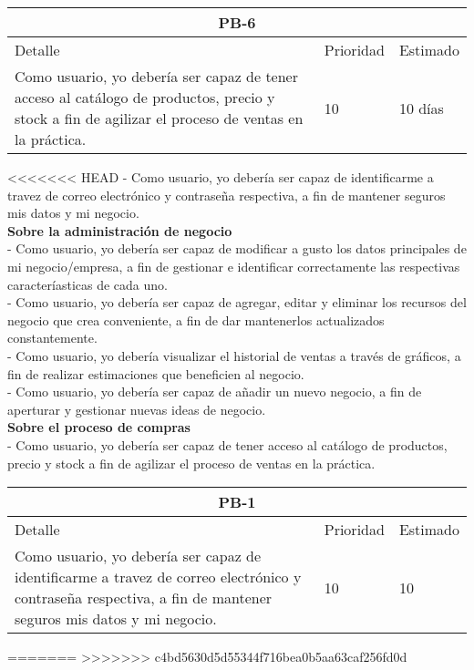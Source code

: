 \begin{table}[htbp]
	\begin{center}
		\begin{tabular}{|p{10cm} | p{2cm} | p{2cm}|}
			\hline
			\multicolumn{3}{|c|}{PB-6}\\
			\hline
			Detalle & Prioridad & Estimado \\
			\hline
			Como usuario, yo debería ser capaz de tener acceso al catálogo de productos, precio y stock a fin de agilizar el proceso de ventas en la práctica. & 10 & 10 días \\
			\hline	
		\end{tabular}
	\end{center}
\end{table}
<<<<<<< HEAD
- Como usuario, yo debería ser capaz de identificarme a travez de correo electrónico y contraseña respectiva, a fin de mantener seguros mis datos y mi negocio.\\
\textbf{Sobre la administración de negocio}\\
- Como usuario, yo debería ser capaz de modificar a gusto los datos principales de mi negocio/empresa, a fin de gestionar e identificar correctamente las respectivas caracteríasticas de cada uno.\\
- Como usuario, yo debería ser capaz de agregar, editar y eliminar los recursos del negocio que crea conveniente, a fin de dar mantenerlos actualizados constantemente.\\
- Como usuario, yo debería visualizar el historial de ventas a través de gráficos, a fin de realizar estimaciones que beneficien al negocio.\\
- Como usuario, yo debería ser capaz de añadir un nuevo negocio, a fin de aperturar y gestionar nuevas ideas de negocio.\\
\textbf{Sobre el proceso de compras}\\
- Como usuario, yo debería ser capaz de tener acceso al catálogo de productos, precio y stock a fin de agilizar el proceso de ventas en la práctica. 

\begin{table}
	\begin{center}
		\begin{tabular}{|p{10cm} | p{2cm} | p{2cm}|}
			\hline
			\multicolumn{3}{|c|}{PB-1}\\
			\hline
			Detalle & Prioridad & Estimado \\
			\hline
			Como usuario, yo debería ser capaz de identificarme a travez de correo electrónico y contraseña respectiva, a fin de mantener seguros mis datos y mi negocio.  & 10 & 10 \\
			\hline	
		\end{tabular}
	\end{center}
\end{table}
=======
>>>>>>> c4bd5630d5d55344f716bea0b5aa63caf256fd0d
